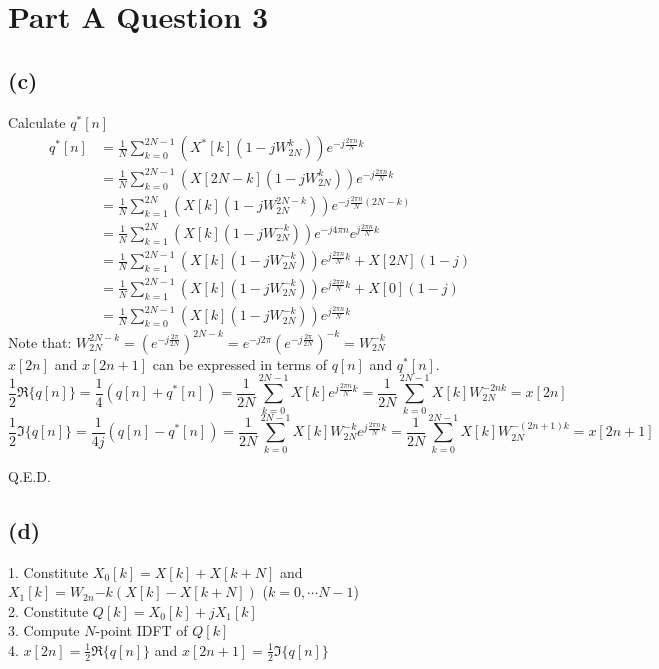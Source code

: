 \documentclass{article}
\newenvironment{homeworkProblem}[1]{
	\section*{#1}
	}{
}
\newenvironment{homeworkSection}[1]{
	\subsection*{#1}
	}{
}
\begin{document}
\begin{homeworkProblem}{Part A Question 3}
\begin{homeworkSection}{(c)}
Calculate $q^*[n]$
\begin{align*}
q^*[n] &= \frac{1}{N} \sum_{k=0}^{2N-1} \left(X^*[k] (1 - j W_{2N}^{k})\right) e^{-j \frac{2 \pi n}{N} k}\\
&= \frac{1}{N} \sum_{k=0}^{2N-1} \left(X[2N-k] (1 - j W_{2N}^{k})\right) e^{-j \frac{2 \pi n}{N} k}\\
&= \frac{1}{N} \sum_{k=1}^{2N} \left(X[k] (1 - j W_{2N}^{2N-k})\right) e^{-j \frac{2 \pi n}{N} (2N-k)}\\
&= \frac{1}{N} \sum_{k=1}^{2N} \left(X[k] (1 - j W_{2N}^{-k})\right) e^{-j 4 \pi n} e^{j \frac{2 \pi n}{N} k}\\
&= \frac{1}{N} \sum_{k=1}^{2N-1} \left(X[k] (1 - j W_{2N}^{-k})\right) e^{j \frac{2 \pi n}{N} k} + X[2N] (1 - j)\\
&= \frac{1}{N} \sum_{k=1}^{2N-1} \left(X[k] (1 - j W_{2N}^{-k})\right) e^{j \frac{2 \pi n}{N} k} + X[0] (1 - j)\\
&= \frac{1}{N} \sum_{k=0}^{2N-1} \left(X[k] (1 - j W_{2N}^{-k})\right) e^{j \frac{2 \pi n}{N} k}
\end{align*}
Note that: $W_{2N}^{2N-k} = (e^{-j \frac{2\pi}{2N}})^{2N-k} = e^{-j2\pi} (e^{-j\frac{2\pi}{2N}})^{-k} = W_{2N}^{-k}$\\

$x[2n]$ and $x[2n+1]$ can be expressed in terms of $q[n]$ and $q^*[n]$.
\begin{equation}
\frac{1}{2} \Re\{q[n]\} = \frac{1}{4} (q[n] + q^*[n])
= \frac{1}{2N} \sum_{k=0}^{2N-1} X[k] e^{j \frac{2 \pi n}{N} k}
= \frac{1}{2N} \sum_{k=0}^{2N-1} X[k] W_{2N}^{-2nk}
= x[2n]
\end{equation}
\begin{equation}
\frac{1}{2} \Im\{q[n]\} = \frac{1}{4j} (q[n] - q^*[n])
= \frac{1}{2N} \sum_{k=0}^{2N-1} X[k] W_{2N}^{-k} e^{j \frac{2 \pi n}{N} k}
= \frac{1}{2N} \sum_{k=0}^{2N-1} X[k] W_{2N}^{-(2n+1)k}
= x[2n+1]
\end{equation}

Q.E.D.

\end{homeworkSection}


\begin{homeworkSection}{(d)}

1. Constitute $X_0[k] = X[k] + X[k+N]$ and $X_1[k] = W_{2n}{-k}(X[k] - X[k+N])$ ($k = 0, \cdots N-1$)\\
2. Constitute $Q[k] = X_0[k] + jX_1[k]$\\
3. Compute $N$-point IDFT of $Q[k]$\\
4. $x[2n] = \frac{1}{2} \Re\{q[n]\}$ and $x[2n+1] = \frac{1}{2} \Im\{q[n]\}$


\end{homeworkSection}
\end{homeworkProblem}
\end{document}

